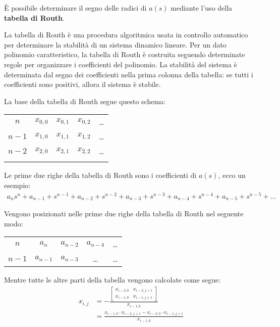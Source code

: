 È possibile determinare il segno delle radici di $a(s)$ mediante l'uso della \textbf{tabella di Routh}.

La tabella di Routh è una procedura algoritmica usata in controllo automatico per determinare la stabilità di un sistema dinamico lineare. Per un dato polinomio caratteristico, la tabella di Routh è costruita seguendo determinate regole per organizzare i coefficienti del polinomio. La stabilità del sistema è determinata dal segno dei coefficienti nella prima colonna della tabella: se tutti i coefficienti sono positivi, allora il sistema è stabile.

La base della tabella di Routh segue questo schema:
\begin{table}[h!]
    \centering
    \begin{tabular}{c | c c c c}
        $n$ & $x_{0, 0}$ & $x_{0, 1}$ & $x_{0, 2}$ & \dots \\
        $n-1$ & $x_{1, 0}$ & $x_{1, 1}$ & $x_{1, 2}$ & \dots \\
        $n-2$ & $x_{2, 0}$ & $x_{2, 1}$ & $x_{2, 2}$ & \dots \\
        \dotfill
    \end{tabular}
\end{table}

Le prime due righe della tabella di Routh sono i coefficienti di $a(s)$, ecco un esempio:
\begin{align}
    a_n s^n +
    a_{n-1} + s^{n-1} +
    a_{n-2} + s^{n-2} +
    a_{n-3} + s^{n-3} +
    a_{n-4} + s^{n-4} +
    a_{n-5} + s^{n-5} + 
    \dots
\end{align}

Vengono posizionati nelle prime due righe della tabella di Routh nel seguente modo:
\begin{table}[h!]
    \centering
    \begin{tabular}{c | c c c c}
        $n$ & $a_n$ & $a_{n-2}$ & $a_{n-4}$ & \dots \\
        $n-1$ & $a_{n-1}$ & $a_{n-3}$ & \dots & \dots
        \dotfill
    \end{tabular}
\end{table}
Mentre tutte le altre parti della tabella vengono calcolate come segue:
\begin{align}
    x_{i, j} &= - \frac{
        \begin{bmatrix}
            x_{i-2, 0} & x_{i-2, j+1} \\
            x_{i-1, 0} & x_{i-1, j+1}
        \end{bmatrix}
    }{x_{i-1, 0}} \\
    &= \frac{x_{i-1, 0} \cdot x_{i-2, j+1} - x_{i-2, 0} \cdot x_{i-1, j+1} }{x_{i-1, 0}}
\end{align}


